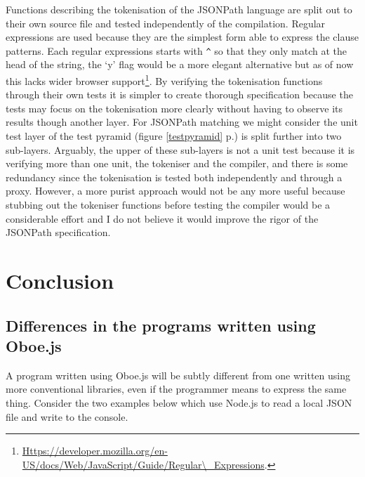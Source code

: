 \documentclass[]{article}
\let\stdsection\section
\renewcommand\section{\newpage\stdsection}
\begin{document}
Functions describing the tokenisation of the JSONPath language are split
out to their own source file and tested independently of the
compilation. Regular expressions are used because they are the simplest
form able to express the clause patterns. Each regular expressions
starts with \texttt{\^{}} so that they only match at the head of the
string, the `y' flag would be a more elegant alternative but as of now
this lacks wider browser support\footnote{\href{https://developer.mozilla.org/en-US/docs/Web/JavaScript/Guide/Regular\textbackslash{}_Expressions}{Https://developer.mozilla.org/en-US/docs/Web/JavaScript/Guide/Regular\textbackslash{}\_Expressions}.}.
By verifying the tokenisation functions through their own tests it is
simpler to create thorough specification because the tests may focus on
the tokenisation more clearly without having to observe its results
though another layer. For JSONPath matching we might consider the unit
test layer of the test pyramid (figure \ref{testpyramid}
p.\pageref{testpyramid}) is split further into two sub-layers. Arguably,
the upper of these sub-layers is not a unit test because it is verifying
more than one unit, the tokeniser and the compiler, and there is some
redundancy since the tokenisation is tested both independently and
through a proxy. However, a more purist approach would not be any more
useful because stubbing out the tokeniser functions before testing the
compiler would be a considerable effort and I do not believe it would
improve the rigor of the JSONPath specification.

\section{Conclusion}

\subsection{Differences in the programs written using Oboe.js}

A program written using Oboe.js will be subtly different from one
written using more conventional libraries, even if the programmer means
to express the same thing. Consider the two examples below which use
Node.js to read a local JSON file and write to the console.
\end{document}
